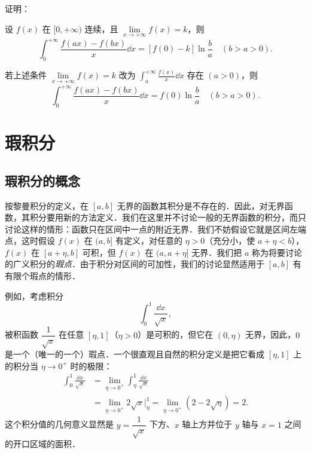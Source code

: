 \begin{xiti}
\item 证明：
\begin{ziti}
\item 设 $f(x)$ 在 $[0,+\infty)$ 连续，且 $\lim\limits_{x\to+\infty}f(x)=k$，则
\[
\int_{0}^{+\infty}\frac{f(ax)-f(bx)}{x}\dd x=\left[f(0)-k\right]\ln\frac{b}{a}\quad(b>a>0).
\]
\item 若上述条件 $\lim\limits_{x\to+\infty}f(x)=k$ 改为 $\displaystyle\int_{a}^{+\infty}\frac{f(x)}{x}\dd x$ 存在 $(a>0)$，则
\[
\int_{0}^{+\infty}\frac{f(ax)-f(bx)}{x}\dd x=f(0)\ln\frac{b}{a}\quad(b>a>0).
\]
\end{ziti}
\end{xiti}

\section{瑕积分}

\subsection{瑕积分的概念}

按黎曼积分的定义，在 $[a,b]$ 无界的函数其积分是不存在的．因此，对无界函数，其积分要用新的方法定义．我们在这里并不讨论一般的无界函数的积分，而只讨论这样的情形：函数只在区间中一点的附近无界．我们不妨假设它就是区间左端点，这时假设 $f(x)$ 在 $(a,b]$ 有定义，对任意的 $\eta>0$（充分小，使 $a+\eta<b$），$f(x)$ 在 $[a+\eta,b]$ 可积，但 $f(x)$ 在 $(a,a+\eta]$ 无界．我们把 $a$ 称为将要讨论的广义积分的\emph{瑕点}．由于积分对区间的可加性，我们的讨论显然适用于 $[a,b]$ 有有限个瑕点的情形．

例如，考虑积分
\[
\int_{0}^{1}\frac{\dd x}{\sqrt{x}},
\]
被积函数 $\dfrac{1}{\sqrt{x}}$ 在任意 $[\eta,1]$（$\eta>0$）是可积的，但它在 $(0,\eta)$ 无界，因此，$0$ 是一个（唯一的一个）瑕点．一个很直观且自然的积分定义是把它看成 $[\eta,1]$ 上的积分当 $\eta\to 0^{+}$ 时的极限：
\[
\begin{aligned}
\int_{0}^{1}\frac{\dd x}{\sqrt{x}}&=\lim_{\eta\to 0^{+}}\int_{\eta}^{1}\frac{\dd x}{\sqrt{x}}\\
&=\lim_{\eta\to 0^{+}}2\sqrt{x}\Big|_{\eta}^{1}=\lim_{\eta\to 0^{+}}\left(2-2\sqrt{\eta}\right)=2.
\end{aligned}
\]
这个积分值的几何意义显然是 $y=\dfrac{1}{\sqrt{x}}$ 下方、$x$ 轴上方并位于 $y$ 轴与 $x=1$ 之间的开口区域的面积．

